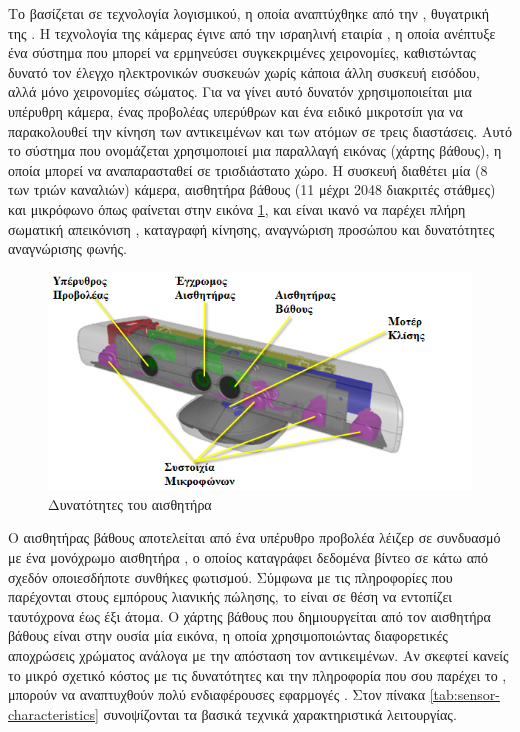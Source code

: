 Το  βασίζεται σε τεχνολογία λογισμικού, η οποία αναπτύχθηκε από την , θυγατρική της . Η τεχνολογία της κάμερας έγινε από την ισραηλινή εταιρία , η οποία ανέπτυξε ένα σύστημα που μπορεί να ερμηνεύσει συγκεκριμένες χειρονομίες, καθιστώντας δυνατό τον έλεγχο ηλεκτρονικών συσκευών χωρίς κάποια άλλη συσκευή εισόδου, αλλά μόνο χειρονομίες σώματος. Για να γίνει αυτό δυνατόν χρησιμοποιείται μια υπέρυθρη κάμερα, ένας προβολέας υπερύθρων και ένα ειδικό μικροτσίπ για να παρακολουθεί την κίνηση των αντικειμένων και των ατόμων σε τρεις διαστάσεις. Αυτό το σύστημα  που ονομάζεται  χρησιμοποιεί μια παραλλαγή εικόνας (χάρτης βάθους), η οποία μπορεί να αναπαρασταθεί σε τρισδιάστατο χώρο. Η συσκευή διαθέτει μία  (8\- των τριών καναλιών) κάμερα, αισθητήρα βάθους (11\- μέχρι 2048 διακριτές στάθμες) και  μικρόφωνο όπως φαίνεται στην εικόνα \ref{fig:kinect-characteristics}, και είναι ικανό να παρέχει πλήρη σωματική απεικόνιση , καταγραφή κίνησης, αναγνώριση προσώπου και δυνατότητες αναγνώρισης φωνής.

\begin{figure}[H]
    \centering
    \includegraphics[width=.7\textwidth]{fig/kinect-characteristics.png}
    \caption{Δυνατότητες του αισθητήρα \protect\footnotemark}
    \label{fig:kinect-characteristics}
\end{figure}

Ο αισθητήρας βάθους αποτελείται από ένα υπέρυθρο προβολέα λέιζερ σε συνδυασμό με ένα μονόχρωμο αισθητήρα , ο οποίος καταγράφει δεδομένα βίντεο σε  κάτω από σχεδόν οποιεσδήποτε συνθήκες φωτισμού. Σύμφωνα με τις πληροφορίες που παρέχονται στους εμπόρους λιανικής πώλησης, το  είναι σε θέση να εντοπίζει ταυτόχρονα έως έξι άτομα. Ο χάρτης βάθους που δημιουργείται από τον αισθητήρα βάθους είναι στην ουσία μία εικόνα, η οποία χρησιμοποιώντας διαφορετικές αποχρώσεις χρώματος ανάλογα με την απόσταση τον αντικειμένων. Αν σκεφτεί κανείς το μικρό σχετικό κόστος με τις δυνατότητες και την πληροφορία που σου παρέχει το , μπορούν να αναπτυχθούν πολύ ενδιαφέρουσες εφαρμογές \cite{jean13}. Στον πίνακα \ref{tab:sensor-characteristics} συνοψίζονται τα βασικά τεχνικά χαρακτηριστικά λειτουργίας.

